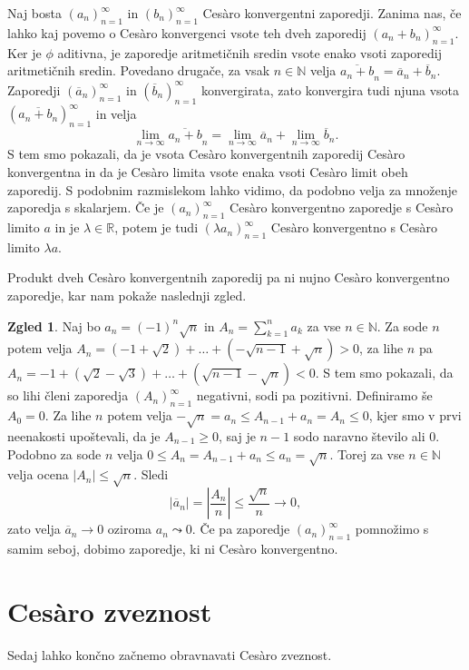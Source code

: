 \documentclass[a4paper,12pt]{article}
\def\N{\mathbb{N}}
\def\R{\mathbb{R}}
\theoremstyle{definition}
\newtheorem{zgled}{Zgled}
\theoremstyle{plain}
\begin{document}
Naj bosta $(a_n)_{n=1}^{\infty}$ in $(b_n)_{n=1}^{\infty}$ Ces\`{a}ro konvergentni zaporedji. Zanima nas, če lahko kaj povemo o Ces\`{a}ro konvergenci vsote teh dveh zaporedij $(a_n + b_n)_{n=1}^{\infty}$. Ker je $\phi$ aditivna, je zaporedje aritmetičnih sredin vsote enako vsoti zaporedij aritmetičnih sredin. Povedano drugače, za vsak $n \in \N$ velja $\overline{a_n + b}_n = \overline{a}_n + \overline{b}_n$. Zaporedji $(\overline{a}_n)_{n=1}^{\infty}$ in $(\overline{b}_n)_{n=1}^{\infty}$ konvergirata, zato konvergira tudi njuna vsota $(\overline{a_n + b_n})_{n=1}^{\infty}$ in velja
$$\lim_{n \rightarrow \infty} \overline{a_n + b}_n = \lim_{n \rightarrow \infty} \overline{a}_n + \lim_{n \rightarrow \infty} \overline{b}_n.$$
S tem smo pokazali, da je vsota Ces\`{a}ro konvergentnih zaporedij Ces\`{a}ro konvergentna in da je Ces\`{a}ro limita vsote enaka vsoti Ces\`{a}ro limit obeh zaporedij.
S podobnim razmislekom lahko vidimo, da podobno velja za množenje zaporedja s skalarjem. Če je $(a_n)_{n=1}^{\infty}$ Ces\`{a}ro konvergentno zaporedje s Ces\`{a}ro limito $a$ in je $\lambda \in \R$, potem je tudi $(\lambda a_n)_{n=1}^{\infty}$ Ces\`{a}ro konvergentno s Ces\`{a}ro limito $\lambda a$.

Produkt dveh Ces\`{a}ro konvergentnih zaporedij pa ni nujno Ces\`{a}ro konvergentno zaporedje, kar nam pokaže naslednji zgled.
\begin{zgled}
    Naj bo $a_n = (-1)^n \sqrt{n}$ in $A_n = \sum_{k=1}^{n}a_k$ za vse $n \in \N$. Za sode $n$ potem velja $A_n = (-1 + \sqrt2) + \ldots + (-\sqrt{n-1} + \sqrt{n}) > 0$, za lihe $n$ pa $A_n = -1 + (\sqrt2 - \sqrt3) + \ldots + (\sqrt{n-1} - \sqrt{n}) < 0$. S tem smo pokazali, da so lihi členi zaporedja $(A_n)_{n=1}^{\infty}$ negativni, sodi pa pozitivni. Definiramo še $A_0 = 0$. Za lihe $n$ potem velja $-\sqrt{n} = a_n \leq A_{n-1} + a_n = A_n \leq 0$, kjer smo v prvi neenakosti upoštevali, da je $A_{n-1} \geq 0$, saj je $n-1$ sodo naravno število ali $0$. Podobno za sode $n$ velja $0 \leq A_n = A_{n-1} + a_n \leq a_n = \sqrt{n}$. Torej za vse $n \in \N$ velja ocena $\left| A_n \right| \leq \sqrt{n}$. Sledi 
    $$\left| \overline{a}_n \right| = \left| \frac{A_n}{n} \right| \leq \frac{\sqrt{n}}{n} \rightarrow 0,$$
    zato velja $\overline{a}_n \rightarrow 0$ oziroma $a_n \leadsto 0$. Če pa zaporedje $(a_n)_{n=1}^{\infty}$ pomnožimo s samim seboj, dobimo zaporedje, ki ni Ces\`{a}ro konvergentno.
\end{zgled}




\section{Ces\`{a}ro zveznost}
Sedaj lahko končno začnemo obravnavati Ces\`{a}ro zveznost.
\end{document}
